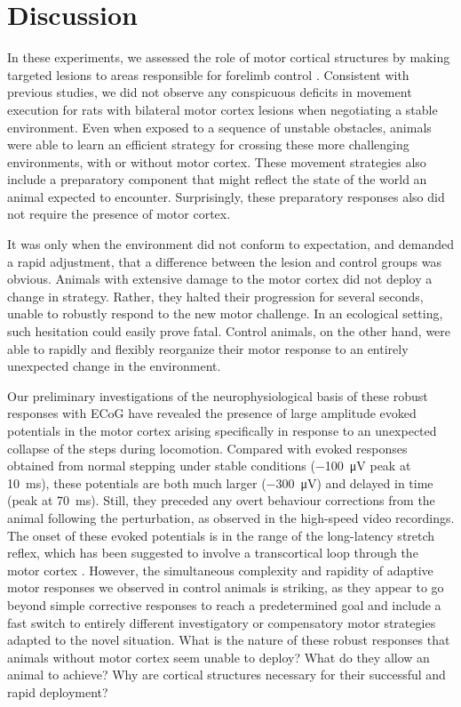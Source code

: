 \section{Discussion}

In these experiments, we assessed the role of motor cortical structures by making targeted lesions to areas responsible for forelimb control \cite{Kawai2015,Otchy2015}. Consistent with previous studies, we did not observe any conspicuous deficits in movement execution for rats with bilateral motor cortex lesions when negotiating a stable environment. Even when exposed to a sequence of unstable obstacles, animals were able to learn an efficient strategy for crossing these more challenging environments, with or without motor cortex. These movement strategies also include a preparatory component that might reflect the state of the world an animal expected to encounter. Surprisingly, these preparatory responses also did not require the presence of motor cortex.

It was only when the environment did not conform to expectation, and demanded a rapid adjustment, that a difference between the lesion and control groups was obvious. Animals with extensive damage to the motor cortex did not deploy a change in strategy. Rather, they halted their progression for several seconds, unable to robustly respond to the new motor challenge. In an ecological setting, such hesitation could easily prove fatal. Control animals, on the other hand, were able to rapidly and flexibly reorganize their motor response to an entirely unexpected change in the environment.

Our preliminary investigations of the neurophysiological basis of these robust responses with ECoG have revealed the presence of large amplitude evoked potentials in the motor cortex arising specifically in response to an unexpected collapse of the steps during locomotion. Compared with evoked responses obtained from normal stepping under stable conditions (\SI{-100}{\micro\volt} peak at \SI{10}{\milli\second}), these potentials are both much larger (\SI{-300}{\micro\volt}) and delayed in time (peak at \SI{70}{\milli\second}). Still, they preceded any overt behaviour corrections from the animal following the perturbation, as observed in the high-speed video recordings. The onset of these evoked potentials is in the range of the long-latency stretch reflex, which has been suggested to involve a transcortical loop through the motor cortex \cite{Phillips1969,Matthews1990,Capaday1991}. However, the simultaneous complexity and rapidity of adaptive motor responses we observed in control animals is striking, as they appear to go beyond simple corrective responses to reach a predetermined goal and include a fast switch to entirely different investigatory or compensatory motor strategies adapted to the novel situation. What is the nature of these robust responses that animals without motor cortex seem unable to deploy? What do they allow an animal to achieve? Why are cortical structures necessary for their successful and rapid deployment?

